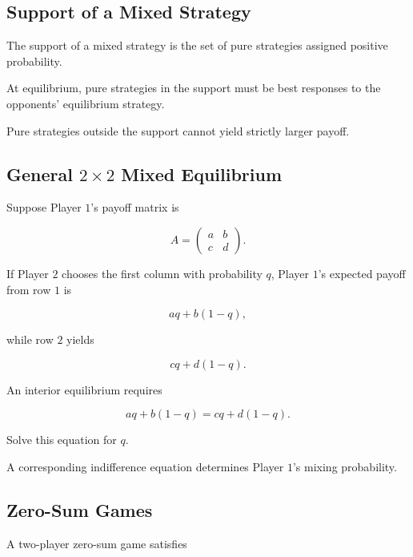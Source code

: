 \subsection{Support of a Mixed Strategy}
\label{subsec:mixed-strategy-support}

The support of a mixed strategy is the set of pure strategies assigned
positive probability.

At equilibrium, pure strategies in the support must be best responses to
the opponents' equilibrium strategy.

Pure strategies outside the support cannot yield strictly larger payoff.

\subsection{General \(2\times2\) Mixed Equilibrium}
\label{subsec:general-two-by-two-mixed}

Suppose Player \(1\)'s payoff matrix is

\[
A
=
\begin{pmatrix}
a & b\\
c & d
\end{pmatrix}.
\]

If Player \(2\) chooses the first column with probability \(q\), Player
\(1\)'s expected payoff from row \(1\) is

\[
aq+b(1-q),
\]

while row \(2\) yields

\[
cq+d(1-q).
\]

An interior equilibrium requires

\[
\boxed{
aq+b(1-q)
=
cq+d(1-q).
}
\]

Solve this equation for \(q\).

A corresponding indifference equation determines Player \(1\)'s mixing
probability.

\subsection{Zero-Sum Games}
\label{subsec:zero-sum-games}

A two-player zero-sum game satisfies

